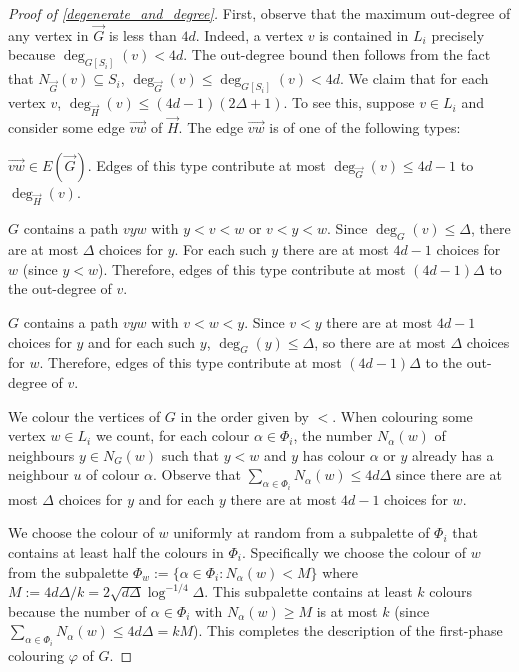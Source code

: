 \documentclass{patmorin}
\begin{document}
\begin{proof}[Proof of \cref{degenerate_and_degree}]
  First, observe that the maximum out-degree of any vertex in $\overrightarrow{G}$ is less than $4d$. Indeed, a vertex $v$ is contained in $L_i$ precisely because $\deg_{G[S_i]}(v)<4d$.  The out-degree bound then follows from the fact that $N_{\overrightarrow{G}}(v)\subseteq S_i$, $\deg_{\overrightarrow{G}}(v)\le\deg_{G[S_i]}(v)<4d$.  We claim that for each vertex $v$, $\deg_{\overrightarrow{H}}(v)\le (4d-1)(2\Delta+1)$.  To see this, suppose $v\in L_i$ and consider some edge $\overrightarrow{vw}$ of $\overrightarrow{H}$.  The edge  $\overrightarrow{vw}$ is of one of the following types:
  \begin{compactenum}[(T1)]
    \item $\overrightarrow{vw}\in E(\overrightarrow{G})$. Edges of this type contribute at most $\deg_{\overrightarrow{G}}(v)\le 4d-1$ to $\deg_{\overrightarrow{H}}(v)$.
    \item $G$ contains a path $vyw$ with $y < v < w$ or $v < y < w$.  Since $\deg_G(v)\le\Delta$, there are at most $\Delta$ choices for $y$.  For each such $y$ there are at most $4d-1$ choices for $w$ (since $y<w$).  Therefore, edges of this type contribute at most $(4d-1)\Delta$ to the out-degree of $v$.
    \item $G$ contains a path $vyw$ with $v < w < y$.  Since $v<y$ there are at most $4d-1$ choices for $y$ and for each such $y$, $\deg_G(y)\le\Delta$, so there are at most $\Delta$ choices for $w$.  Therefore, edges of this type contribute at most $(4d-1)\Delta$ to the out-degree of $v$.
  \end{compactenum}
  We colour the vertices of $G$ in the order given by $<$.  When colouring some vertex $w\in L_i$ we count, for each colour $\alpha\in \Phi_i$, the number $N_\alpha(w)$ of neighbours $y\in N_G(w)$ such that $y < w$ and $y$ has colour $\alpha$ or $y$ already has a neighbour $u$ of colour $\alpha$. Observe that $\sum_{\alpha\in \Phi_i} N_\alpha(w)\le 4d\Delta$ since there are at most $\Delta$ choices for $y$ and for each $y$ there are at most $4d-1$ choices for $w$.

  We choose the colour of $w$ uniformly at random from a subpalette of $\Phi_i$ that contains at least half the colours in $\Phi_i$.  Specifically we choose the colour of $w$ from the subpalette $\Phi_w:=\{\alpha\in\Phi_i: N_{\alpha}(w)<M\}$ where $M:=4d\Delta/k = 2\sqrt{d\Delta}\log^{-1/4}\Delta$.  This subpalette contains at least $k$ colours because the number of $\alpha\in\Phi_i$ with $N_\alpha(w)\ge M$ is at most $k$   (since $\sum_{\alpha\in\Phi_i} N_\alpha(w) \le 4d\Delta = kM$).
  This completes the description of the first-phase colouring $\varphi$ of $G$.


\end{proof}
\end{document}
